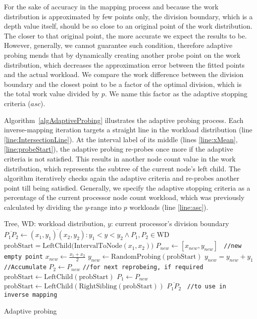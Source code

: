 \documentclass[conference,compsoc]{IEEEtran}
\begin{document}
For the sake of accuracy in the mapping process and because the work distribution is approximated by few points only, the division boundary, which is a depth value itself, should be so close to an original point of the work distribution. The closer to that original point, the more accurate we expect the results to be. However, generally, we cannot guarantee such condition, therefore adaptive probing mends that by dynamically creating another probe point on the work distribution, which decreases the approximation error between the fitted points and the actual workload. We compare the work difference between the division boundary and the closest point to be a factor of the optimal division, which is the total work value divided by $ p $. We name this factor as the adaptive stopping criteria ($ asc $).

Algorithm~\ref{algAdaptiveProbing} illustrates the adaptive probing process. Each inverse-mapping iteration targets a straight line in the workload distribution (line \ref{line:IntersectionLine}). At the interval label of its middle (lines \ref{line:xMean}, \ref{line:probeStart}), the adaptive probing re-probes once more if the adaptive criteria is not satisfied. This results in another node count value in the work distribution, which represents the subtree of the current node's left child. The algorithm iteratively checks again the adaptive criteria and re-probes another point till being satisfied. Generally, we specify the adaptive stopping criteria as a percentage of the current processor node count workload, which was previously calculated by dividing the $ y $-range into $ p $ workloads (line \ref{line:asc}).
\begin{algorithm}
	\begin{algorithmic}[1]
		\REQUIRE Tree, $ \mathrm{WD} $: workload distribution, $ y $:  current processor's division boundary
		\STATE \label{line:IntersectionLine} $ \overline{P_1P_2} \gets \overline{(x_1,y_1)(x_2,y_2)}: y_1<y<y_2 \land P_1, P_2 \in \mathrm{WD}$    
		\STATE $ \mathrm{probStart} =  \mathrm{LeftChild(IntervalToNode}(x_1, x_2)) $ \label{line:probeStart}
		 \label{line:asc}
		\STATE $ P_{\mathit{new}} \gets [x_\mathit{new}, y_\mathit{new}]$ \texttt{	//new empty point}
		\STATE $ x_\mathit{new} \gets \frac{x_1+x_2}{2} $ \label{line:xMean}
		\STATE $ y_\mathit{new} \gets \mathrm{RandomProbing(probStart)} $
		\STATE  $ y_\mathit{new} = y_\mathit{new}+y_1 $ \texttt{		//Accumulate}
		\STATE $ P_2 \gets P_\mathit{new} $
		\STATE \texttt{//for next reprobeing, if required}
		\STATE $ \mathrm{probStart} \gets \mathrm{LeftChild(probStart)}$
		\STATE $ P_1 \gets P_\mathit{new} $
		\STATE $ \mathrm{probStart} \gets \mathrm{LeftChild(RightSibling(probStart))} $
		\ENDIF
		\ENDWHILE
		\RETURN $ \overline{P_1P_2} $ \texttt{	//to  use in inverse mapping}
	\end{algorithmic}
	\caption{Adaptive probing}
	\label{algAdaptiveProbing}
\end{algorithm}
\end{document}
